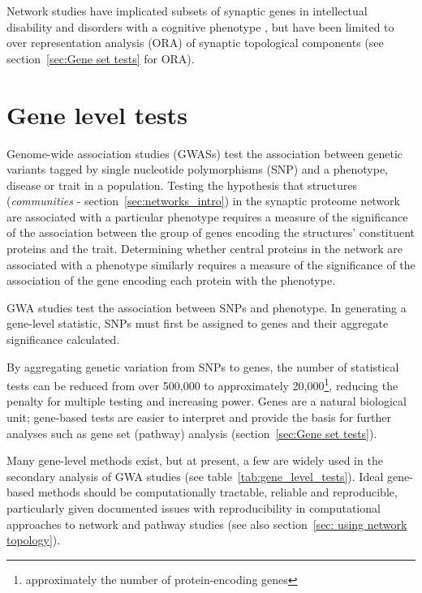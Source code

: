 Network studies have implicated subsets of synaptic genes in intellectual disability and disorders with a cognitive phenotype \cite{pocklington2006proteomes},\cite{mclean2016improved} but have been limited to over representation analysis (ORA) of synaptic topological components (see section~\ref{sec:Gene set tests} for ORA). 


\section{Gene level tests}
\label{sec: gene level tests}


Genome-wide association studies (GWASs) test the association between genetic variants tagged by single nucleotide polymorphisms (SNP) and a phenotype, disease or trait in a population\cite{visscher201710}. 
 Testing the hypothesis that structures (\textit{communities} - section~\ref{sec:networks_intro}) in the synaptic proteome network are associated with a particular phenotype requires a measure of the significance of the association between the group of genes encoding the structures' constituent proteins and the trait. Determining whether central proteins in the network are associated with a phenotype similarly requires a measure of the significance of the association of the gene encoding each protein with the phenotype.  

 GWA studies test the association between SNPs and phenotype. In generating a gene-level statistic, SNPs must first be assigned to genes and their aggregate significance calculated\cite{petersen2013assessing}.

 By aggregating genetic variation from SNPs to genes, the number of statistical tests can be reduced from over 500,000 to approximately 20,000\footnote{approximately the number of protein-encoding genes}, reducing the penalty for multiple testing and increasing power. Genes are a natural biological unit; gene-based tests are easier to interpret and provide the basis for further analyses such as gene set (pathway) analysis (section~\ref{sec:Gene set tests}).
 
 Many gene-level methods exist, but at present, a few are widely used in the secondary analysis of GWA studies (see table~\ref{tab:gene_level_tests}). Ideal gene-based methods should be computationally tractable, reliable and reproducible, particularly given documented issues with reproducibility in computational approaches to network and pathway studies  (see also section~\ref{sec: using network topology})\cite{mitra2013integrative}.
 
